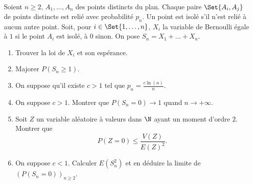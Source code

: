 \begin{enonce}
\begin{exercise}[ID={RMS130 E750},subtitle={Mines-Ponts PSI 2019},tags={}]
Soient $n\geq 2$, $A_1,\dots,A_n$ des points distincts du plan.
  Chaque paire $\Set{A_i,A_j}$ de points distincts est relié avec probabilité $p_n$.
  Un point est isolé s'il n'est relié à aucun autre point.
  Soit, pour $i\in\Set{1,\dots,n}$, $X_i$ la variable de Bernoulli égale à $1$ si le point $A_i$ est isolé, à $0$ sinon.
  On pose $S_n = X_1 + \dots + X_n$.

  \begin{enumerate}
    \item Trouver la loi de $X_i$ et son espérance.
    \item Majorer $P(S_n\geq 1)$.

    \item[]    On suppose qu'il existe $c>1$ tel que $p_n = \frac{c\ln(n)}{n}$.

    \item On suppose $c>1$. Montrer que $P(S_n=0)\to 1$ quand $n\to+\infty$.

    \item Soit $Z$ un variable aléatoire à valeurs dans $\N$ ayant un moment d'ordre $2$.
      Montrer que
      \begin{equation*}
      P(Z=0)\leq \frac{V(Z)}{E(Z)^2}.
      \end{equation*}

    \item On suppose $c<1$.
      Calculer $E(S_n^2)$ et en déduire la limite de $\left( P(S_n=0) \right)_{n\geq2}$.
  \end{enumerate}
\end{exercise}
\begin{solution}
\end{solution}
\end{enonce}

